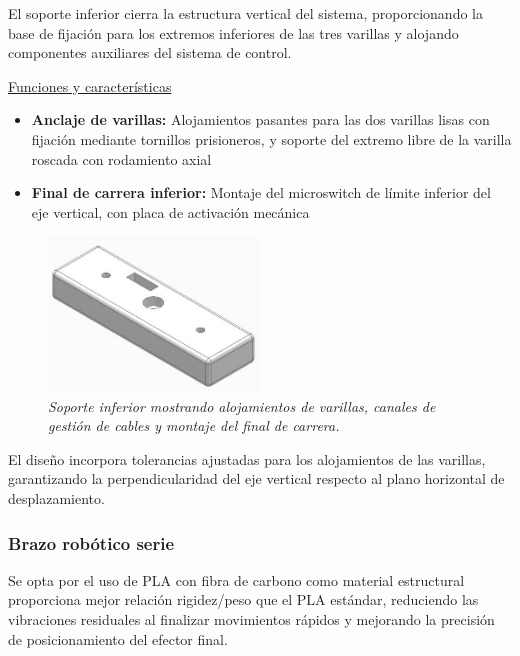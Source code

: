 El soporte inferior cierra la estructura vertical del sistema, proporcionando la base de fijación para los extremos inferiores de las tres varillas y alojando componentes auxiliares del sistema de control.

\underline{Funciones y características}\\

\begin{itemize}[label=$\bullet$]
    \item \textbf{Anclaje de varillas:} Alojamientos pasantes para las dos varillas lisas con fijación mediante tornillos prisioneros, y soporte del extremo libre de la varilla roscada con rodamiento axial
    \item \textbf{Final de carrera inferior:} Montaje del microswitch de límite inferior del eje vertical, con placa de activación mecánica
\end{itemize}

\begin{figure}[H]
    \centering
    \includegraphics[width=0.5\textwidth]{img/InferiorReal_simplificado_vista.jpg}
    \caption{\textit{Soporte inferior mostrando alojamientos de varillas, canales de gestión de cables y montaje del final de carrera.}}
    \label{fig:soporte_inferior_real}
\end{figure}

El diseño incorpora tolerancias ajustadas para los alojamientos de las varillas, garantizando la perpendicularidad del eje vertical respecto al plano horizontal de desplazamiento.

\subsubsection{Brazo robótico serie}

Se opta por el uso de PLA con fibra de carbono como material estructural proporciona mejor relación rigidez/peso que el PLA estándar, reduciendo las vibraciones residuales al finalizar movimientos rápidos y mejorando la precisión de posicionamiento del efector final.

